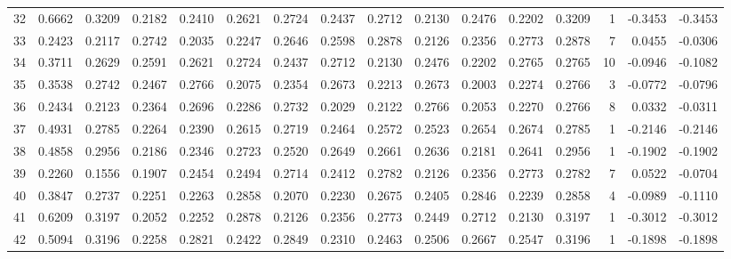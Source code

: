 \begin{tabular}{lrrrrrrrrrrrrrrr}
32  &      0.6662 &  0.3209 &  0.2182 &  0.2410 &  0.2621 &  0.2724 &  0.2437 &  0.2712 &  0.2130 &  0.2476 &   0.2202 &     0.3209 &      1 &                   -0.3453 &                    -0.3453 \\
33  &      0.2423 &  0.2117 &  0.2742 &  0.2035 &  0.2247 &  0.2646 &  0.2598 &  0.2878 &  0.2126 &  0.2356 &   0.2773 &     0.2878 &      7 &                    0.0455 &                    -0.0306 \\
34  &      0.3711 &  0.2629 &  0.2591 &  0.2621 &  0.2724 &  0.2437 &  0.2712 &  0.2130 &  0.2476 &  0.2202 &   0.2765 &     0.2765 &     10 &                   -0.0946 &                    -0.1082 \\
35  &      0.3538 &  0.2742 &  0.2467 &  0.2766 &  0.2075 &  0.2354 &  0.2673 &  0.2213 &  0.2673 &  0.2003 &   0.2274 &     0.2766 &      3 &                   -0.0772 &                    -0.0796 \\
36  &      0.2434 &  0.2123 &  0.2364 &  0.2696 &  0.2286 &  0.2732 &  0.2029 &  0.2122 &  0.2766 &  0.2053 &   0.2270 &     0.2766 &      8 &                    0.0332 &                    -0.0311 \\
37  &      0.4931 &  0.2785 &  0.2264 &  0.2390 &  0.2615 &  0.2719 &  0.2464 &  0.2572 &  0.2523 &  0.2654 &   0.2674 &     0.2785 &      1 &                   -0.2146 &                    -0.2146 \\
38  &      0.4858 &  0.2956 &  0.2186 &  0.2346 &  0.2723 &  0.2520 &  0.2649 &  0.2661 &  0.2636 &  0.2181 &   0.2641 &     0.2956 &      1 &                   -0.1902 &                    -0.1902 \\
39  &      0.2260 &  0.1556 &  0.1907 &  0.2454 &  0.2494 &  0.2714 &  0.2412 &  0.2782 &  0.2126 &  0.2356 &   0.2773 &     0.2782 &      7 &                    0.0522 &                    -0.0704 \\
40  &      0.3847 &  0.2737 &  0.2251 &  0.2263 &  0.2858 &  0.2070 &  0.2230 &  0.2675 &  0.2405 &  0.2846 &   0.2239 &     0.2858 &      4 &                   -0.0989 &                    -0.1110 \\
41  &      0.6209 &  0.3197 &  0.2052 &  0.2252 &  0.2878 &  0.2126 &  0.2356 &  0.2773 &  0.2449 &  0.2712 &   0.2130 &     0.3197 &      1 &                   -0.3012 &                    -0.3012 \\
42  &      0.5094 &  0.3196 &  0.2258 &  0.2821 &  0.2422 &  0.2849 &  0.2310 &  0.2463 &  0.2506 &  0.2667 &   0.2547 &     0.3196 &      1 &                   -0.1898 &                    -0.1898 \\

\end{tabular}

